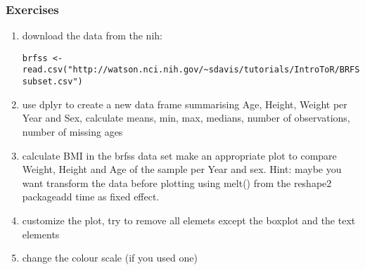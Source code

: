 \begin{frame}[fragile]\frametitle{Exercises}
  \begin{enumerate}
  \item download the data from the nih:\tiny
\begin{verbatim}
brfss <- read.csv("http://watson.nci.nih.gov/~sdavis/tutorials/IntroToR/BRFSS-subset.csv")  
\end{verbatim}
\normalsize
  \item use dplyr to create a new data frame summarising Age, Height, Weight per Year and Sex, calculate means, min, max, medians, number of observations, number of missing ages
  \item calculate BMI in the brfss data set make an appropriate plot to compare Weight, Height and Age of the sample per Year and sex. Hint: maybe you want transform the data before plotting using melt() from the reshape2 packageadd time as fixed effect.
  \item customize the plot, try to remove all elemets except the boxplot and the text elements
  \item change the colour scale (if you used one)
  \end{enumerate}
\end{frame}


